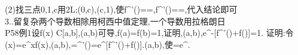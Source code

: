\documentclass[a4paper,fleqn]{article}
\begin{document}
(2)找三点0,1,c用2L;\exists\xi\in(0,c),\eta\in(c,1),使f^{'}(\xi)==,f^{'}(\eta)==,代入结论即可\\
3.\xi{}.留复杂\qquad 两个导数相除用柯西中值定理,一个导数用拉格朗日\\
P58例1设f(x) \in C[a,b],(a,b)可导,f(a)=f(b)=1,证明\exists\xi,\eta\in(a,b),e^{\eta-\xi}[f^{'}(\eta)+f(\eta)]=1.
证明:令\varphi(x)=e^xf(x),\exists\in(a,b),=\varphi^{'}(\eta)\Rightarrow \quad {}=e^{\eta}[f^{'}(\eta)+f(\eta)].\exists\xi\in(a,b),使=e^{\xi}.\\
\)
\end{document}
